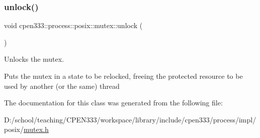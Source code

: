 \subsubsection{\texorpdfstring{unlock()}{unlock()}}
{\footnotesize\ttfamily void cpen333\+::process\+::posix\+::mutex\+::unlock (\begin{DoxyParamCaption}{ }\end{DoxyParamCaption})\hspace{0.3cm}{\ttfamily [inline]}}



Unlocks the mutex. 

Puts the mutex in a state to be relocked, freeing the protected resource to be used by another (or the same) thread 

The documentation for this class was generated from the following file\+:\begin{DoxyCompactItemize}
\item 
D\+:/school/teaching/\+C\+P\+E\+N333/workspace/library/include/cpen333/process/impl/posix/\hyperlink{impl_2posix_2mutex_8h}{mutex.\+h}\end{DoxyCompactItemize}
